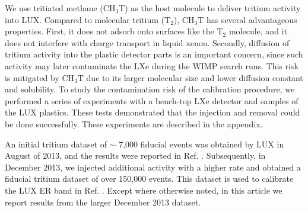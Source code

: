 We use tritiated methane (CH$_3$T) as the host molecule to deliver tritium activity into LUX. Compared to molecular tritium (T$_2$), CH$_3$T has several advantageous properties. First, it does not adsorb onto surfaces like the T$_2$ molecule, and it does not interfere with charge transport in liquid xenon. Secondly, diffusion of tritium activity into the plastic detector parts is an important concern, since such activity may later contaminate the LXe during the WIMP search runs.  This risk is mitigated by CH$_3$T due to its larger molecular size and lower diffusion constant and solubility. To study the contamination risk of the calibration procedure, we performed a series of experiments with a bench-top LXe detector and samples of the LUX plastics. These tests demonstrated that the injection and removal could be done successfully. These experiments are described in the appendix.

An initial tritium dataset of $\sim$ 7,000 fiducial events was obtained by LUX in August of 2013, and the results were reported in Ref. \cite{lux-results}. Subsequently, in December 2013, we injected additional activity with a higher rate and obtained a fiducial tritium dataset of over 150,000 events. This dataset is used to calibrate the LUX ER band in Ref. \cite{lux-reanalysis}. Except where otherwise noted, in this article we report results from the larger December 2013 dataset.